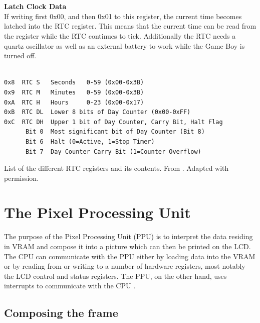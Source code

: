 \\\\
\textbf{Latch Clock Data}
\\
If writing first 0x00, and then 0x01 to this register, the current time becomes latched into the RTC register. This means that the current time can be read from the register while the RTC continues to tick. Additionally the RTC needs a quartz oscillator as well as an external battery to work while the Game Boy is turned off. 
\\\\
\begin{table}[H]
    \begin{center}

\begin{BVerbatim}
0x8  RTC S   Seconds   0-59 (0x00-0x3B)
0x9  RTC M   Minutes   0-59 (0x00-0x3B)
0xA  RTC H   Hours     0-23 (0x00-0x17)
0xB  RTC DL  Lower 8 bits of Day Counter (0x00-0xFF)
0xC  RTC DH  Upper 1 bit of Day Counter, Carry Bit, Halt Flag
      Bit 0  Most significant bit of Day Counter (Bit 8)
      Bit 6  Halt (0=Active, 1=Stop Timer)
      Bit 7  Day Counter Carry Bit (1=Counter Overflow)
\end{BVerbatim}

    \caption{List of the different RTC registers and its contents. From \cite{pandocsmbc}. Adapted with permission.}
    \label{tab:rtc_registers}
    \end{center}
\end{table}



\newpage
\section{The Pixel Processing Unit}
\label{sec:PPU}

The purpose of the Pixel Processing Unit (PPU) is to interpret the data residing in VRAM and compose it into a picture which can then be printed on the LCD. The CPU can communicate with the PPU either by loading data into the VRAM or by reading from or writing to a number of hardware registers, most notably the LCD control and status registers. The PPU, on the other hand, uses interrupts to communicate with the CPU \cite{pandocsVideo}.

\subsection{Composing the frame}
\label{sec:PPU_image}

